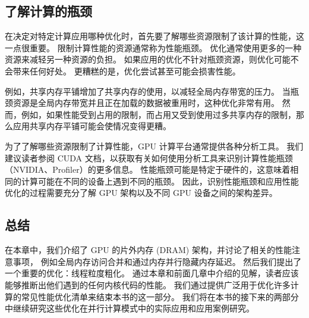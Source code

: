 \subsection{了解计算的瓶颈}
在决定对特定计算应用哪种优化时，首先要了解哪些资源限制了该计算的性能，这一点很重要。 
限制计算性能的资源通常称为性能瓶颈。 优化通常使用更多的一种资源来减轻另一种资源的负担。 
如果应用的优化不针对瓶颈资源，则优化可能不会带来任何好处。 更糟糕的是，优化尝试甚至可能会损害性能。

例如，共享内存平铺增加了共享内存的使用，以减轻全局内存带宽的压力。 
当瓶颈资源是全局内存带宽并且正在加载的数据被重用时，这种优化非常有用。 
然而，例如，如果性能受到占用的限制，而占用又受到使用过多共享内存的限制，那么应用共享内存平铺可能会使情况变得更糟。

为了了解哪些资源限制了计算性能，GPU 计算平台通常提供各种分析工具。 
我们建议读者参阅 CUDA 文档，以获取有关如何使用分析工具来识别计算性能瓶颈（NVIDIA、Profiler）的更多信息。 
性能瓶颈可能是特定于硬件的，这意味着相同的计算可能在不同的设备上遇到不同的瓶颈。 
因此，识别性能瓶颈和应用性能优化的过程需要充分了解 GPU 架构以及不同 GPU 设备之间的架构差异。

\subsection{总结}
在本章中，我们介绍了 GPU 的片外内存 (DRAM) 架构，并讨论了相关的性能注意事项，
例如全局内存访问合并和通过内存并行隐藏内存延迟。 然后我们提出了一个重要的优化：线程粒度粗化。 
通过本章和前面几章中介绍的见解，读者应该能够推断出他们遇到的任何内核代码的性能。 
我们通过提供广泛用于优化许多计算的常见性能优化清单来结束本书的这一部分。 
我们将在本书的接下来的两部分中继续研究这些优化在并行计算模式中的实际应用和应用案例研究。
